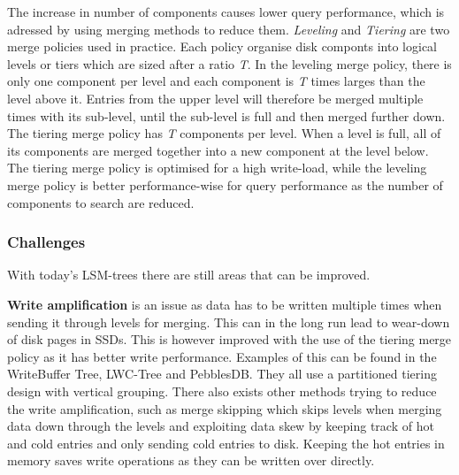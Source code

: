 The increase in number of components causes lower query performance, which is adressed by using merging methods to reduce them. \emph{Leveling} and \emph{Tiering} are two merge policies used in practice. Each policy organise disk componts into logical levels or tiers which are sized after a ratio \emph{T}. In the leveling merge policy, there is only one component per level and each component is \emph{T} times larges than the level above it. Entries from the upper level will therefore be merged multiple times with its sub-level, until the sub-level is full and then merged further down. The tiering merge policy has \emph{T} components per level. When a level is full, all of its components are merged together into a new component at the level below. The tiering merge policy is optimised for a high write-load, while the leveling merge policy is better performance-wise for query performance as the number of components to search are reduced\cite{LSMSurvey}. 

\subsubsection{Challenges}
With today's LSM-trees there are still areas that can be improved. \newline

\noindent
\textbf{Write amplification} is an issue as data has to be written multiple times when sending it through levels for merging. This can in the long run lead to wear-down of disk pages in SSDs. This is however improved with the use of the tiering merge policy as it has better write performance. Examples of this can be found in the WriteBuffer Tree\cite{WBTree}, LWC-Tree\cite{LWCTree1}\cite{LWCTree2} and PebblesDB\cite{PebblesDB}. They all use a partitioned tiering design with vertical grouping. There also exists other methods trying to reduce the write amplification, such as merge skipping which skips levels when merging data down through the levels\cite{SkipTree} and exploiting data skew by keeping track of hot and cold entries and only sending cold entries to disk\cite{TRIAD}. Keeping the hot entries in memory saves write operations as they can be written over directly. \newline

